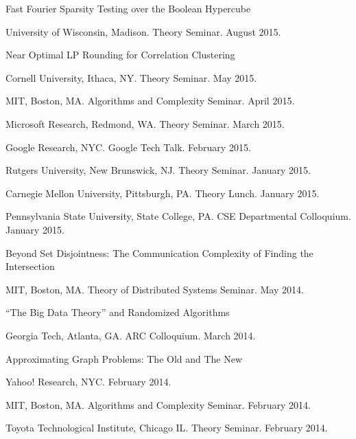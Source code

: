 \documentclass[11pt]{article}
\newenvironment{innerlist}[1][\enskip\textbullet]%
        {\begin{compactitem}[#1]}{\end{compactitem}}
\begin{document}
\begin{innerlist}
\item Fast Fourier Sparsity Testing over the Boolean Hypercube
\begin{innerlist}
\item University of Wisconsin, Madison. Theory Seminar. August 2015.
\end{innerlist}

\item Near Optimal LP Rounding for Correlation Clustering
\begin{innerlist}
\item Cornell University, Ithaca, NY. Theory Seminar. May 2015.
\item MIT, Boston, MA. Algorithms and Complexity Seminar. April 2015.
\item Microsoft Research, Redmond, WA. Theory Seminar. March 2015.
\item Google Research, NYC. Google Tech Talk. February 2015.
\item Rutgers University, New Brunswick, NJ. Theory Seminar. January 2015.
\item Carnegie Mellon University, Pittsburgh, PA. Theory Lunch. January 2015.
\item Pennsylvania State University, State College, PA. CSE Departmental Colloquium. January 2015.
\end{innerlist}

\item Beyond Set Disjointness: The Communication Complexity of Finding the Intersection
\begin{innerlist}
\item MIT, Boston, MA. Theory of Distributed Systems Seminar. May 2014.
\end{innerlist}

\item ``The Big Data Theory'' and Randomized Algorithms
\begin{innerlist}
\item Georgia Tech, Atlanta, GA. ARC Colloquium. March 2014.
\end{innerlist}

\item Approximating Graph Problems: The Old and The New
\begin{innerlist}
\item Yahoo! Research, NYC. February 2014.
\item MIT, Boston, MA. Algorithms and Complexity Seminar. February 2014.
\item Toyota Technological Institute, Chicago IL. Theory Seminar. February 2014.
\end{innerlist}


\end{innerlist}
\end{document}
